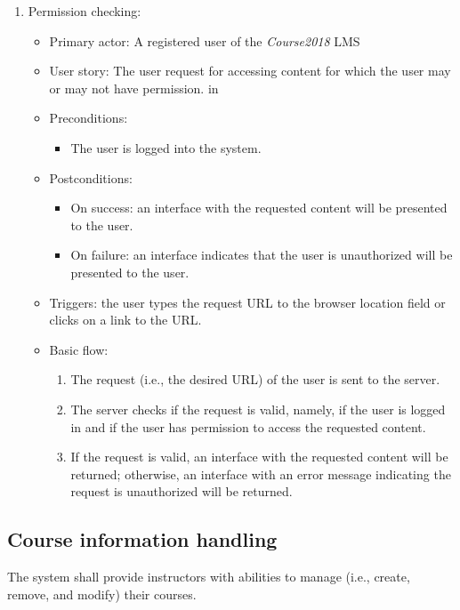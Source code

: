 \begin{enumerate}
\item Permission checking:
\begin{itemize}
\item Primary actor: 
    A registered user of the \emph{Course2018} LMS
\item User story:
    The user request for accessing content for which the user may or may not
    have permission.
 in
\item Preconditions:
    \begin{itemize}
        \item The user is logged into the system.
    \end{itemize}
\item Postconditions:
    \begin{itemize}
        \item On success: an interface with the requested content will be presented
            to the user.
        \item On failure: an interface indicates that the user is unauthorized will
            be presented to the user.
    \end{itemize}
\item Triggers: the user types the request URL to the browser location field
    or clicks on a link to the URL.
\item Basic flow:
    \begin{enumerate}
        \item The request (i.e., the desired URL) of the user is sent to the server.
        \item The server checks if the request is valid, namely, if the user
            is logged in and if the user has permission to access the requested
            content.
        \item If the request is valid, an interface with the requested content will
            be returned; otherwise, an interface with an error message 
            indicating the request is unauthorized will be returned.
    \end{enumerate}
\end{itemize}

\end{enumerate}


\subsection{Course information handling}
The system shall provide instructors with abilities to manage (i.e., create, remove,
and modify) their courses.
